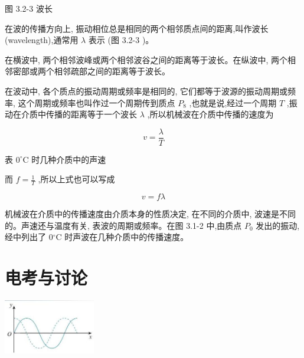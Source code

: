 \documentclass[10pt]{article}
\begin{document}
图 3.2-3 波长

在波的传播方向上, 振动相位总是相同的两个相邻质点间的距离,叫作波长 (wavelength),通常用 \(\lambda\) 表示 (图 3.2-3 )。

在横波中, 两个相邻波峰或两个相邻波谷之间的距离等于波长。在纵波中, 两个相邻密部或两个相邻疏部之间的距离等于波长。

在波动中, 各个质点的振动周期或频率是相同的, 它们都等于波源的振动周期或频率, 这个周期或频率也叫作过一个周期传到质点 \({P}_{8}\) ,也就是说,经过一个周期 \(T\) ,振动在介质中传播的距离等于一个波长 \(\lambda\) ,所以机械波在介质中传播的速度为

\[
v = \frac{\lambda }{T}
\]

表 \({0}^{ \circ }\mathrm{C}\) 时几种介质中的声速

\begin{center}
\end{center}

而 \(f = \frac{1}{T}\) ,所以上式也可以写成

\[
v = {f\lambda }
\]

机械波在介质中的传播速度由介质本身的性质决定, 在不同的介质中, 波速是不同的。声速还与温度有关, 表波的周期或频率。在图 3.1-2 中,由质点 \({P}_{0}\) 发出的振动,经中列出了 \(0{}^{ \circ }\mathrm{C}\) 时声波在几种介质中的传播速度。

\section*{电考与讨论}

\begin{center}
\includegraphics[max width=0.3\textwidth]{images/01910e4c-ebb8-7d2c-8f2f-2375bc1d2d12_74_206063.jpg}
\end{center}
\end{document}
